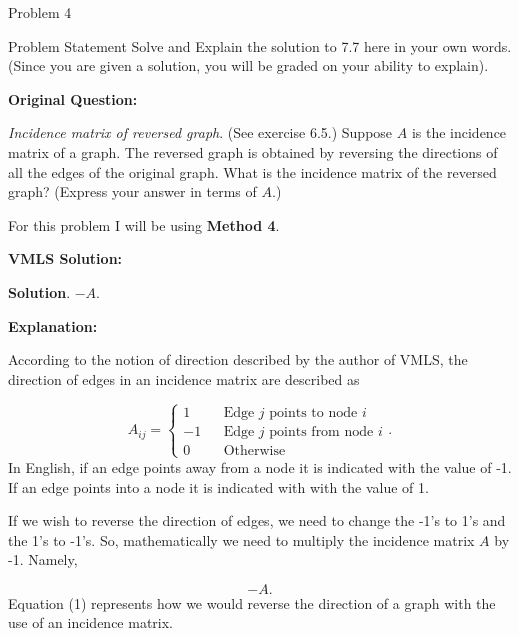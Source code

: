 \begin{problem}{Problem 4}
    \begin{statement}{Problem Statement}
        Solve and Explain the solution to 7.7 here in your own words. (Since you are given a solution, you will be graded on your ability to explain). \vspace*{1em}

        \noindent \textbf{Original Question:} \vspace*{1em}

        \textit{Incidence matrix of reversed graph}. (See exercise 6.5.) Suppose $A$ is the incidence matrix of a graph. The reversed graph is obtained by reversing the directions of all the edges of the 
        original graph. What is the incidence matrix of the reversed graph? (Express your answer in terms of $A$.)
    \end{statement}

    \begin{highlight}[Solution]
        For this problem I will be using \textbf{Method 4}. \vspace*{1em}

        \noindent \textbf{VMLS Solution:} \vspace*{1em}

        \textbf{Solution}. $-A$. \vspace*{1em}

        \noindent \textbf{Explanation:} \vspace*{1em}

        According to the notion of direction described by the author of VMLS, the direction of edges in an incidence matrix are described as

        \begin{equation*}
            A_{ij} = \left\{
                \begin{aligned}
                    1 & & \text{Edge $j$ points to node $i$} \\
                    -1 & & \text{Edge $j$ points from node $i$} \\
                    0 & & \text{Otherwise}
                \end{aligned}
            \right. .
        \end{equation*}
        In English, if an edge points away from a node it is indicated with the value of -1. If an edge points into a node it is indicated with with the value of 1.

        If we wish to reverse the direction of edges, we need to change the -1's to 1's and the 1's to -1's. So, mathematically we need to multiply the incidence matrix $A$ by -1. Namely,

        \setcounter{equation}{0}
        \begin{equation}
            -A.
        \end{equation}
        Equation (1) represents how we would reverse the direction of a graph with the use of an incidence matrix.
    \end{highlight}
\end{problem}

